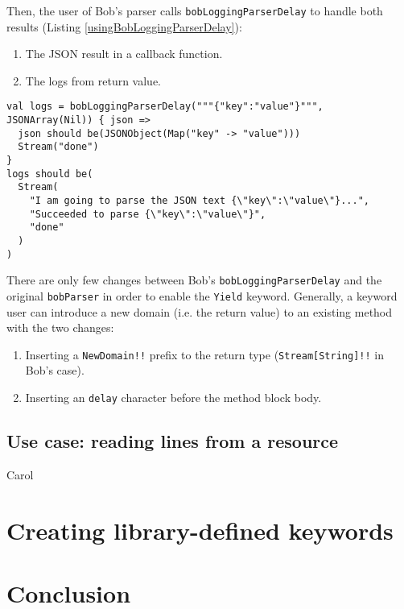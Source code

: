 Then, the user of Bob's parser calls \lstinline{bobLoggingParserDelay} to handle both results (Listing \ref{usingBobLoggingParserDelay}):

\begin{enumerate}
  \item The JSON result in a callback function.
  \item The logs from return value.
\end{enumerate}

\begin{lstlisting}[caption={Using Bob's parser},label={usingBobLoggingParserDelay}]
val logs = bobLoggingParserDelay("""{"key":"value"}""", JSONArray(Nil)) { json =>
  json should be(JSONObject(Map("key" -> "value")))
  Stream("done")
}
logs should be(
  Stream(
    "I am going to parse the JSON text {\"key\":\"value\"}...",
    "Succeeded to parse {\"key\":\"value\"}",
    "done"
  )
)
\end{lstlisting}

There are only few changes between Bob's \lstinline{bobLoggingParserDelay} and the original \lstinline{bobParser} in order to enable the \lstinline{Yield} keyword. Generally, a keyword user can introduce a new domain (i.e. the return value) to an existing method with the two changes:

\begin{enumerate}
  \item Inserting a \lstinline{NewDomain!!} prefix to the return type (\lstinline{Stream[String]!!} in Bob's case).
  \item Inserting an \lstinline{delay} character before the method block body.
\end{enumerate}

\subsection{Use case: reading lines from a resource}

Carol

\section{Creating library-defined keywords}
\label{Creating library-defined keywords}





\section{Conclusion}
\label{conclusion}


\clearpage
\appendix

\printglossary

\begin{acks}
\end{acks}


